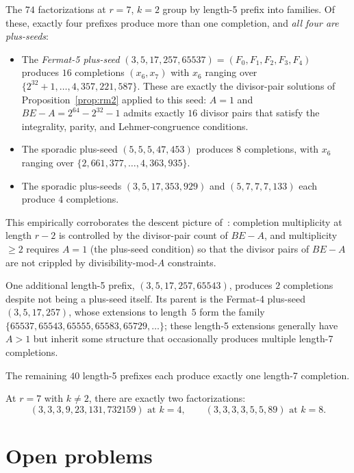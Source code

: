 \documentclass[11pt]{article}
\theoremstyle{definition}
\theoremstyle{remark}
\begin{document}
The $74$ factorizations at $r = 7$, $k = 2$ group by length-5 prefix
into families. Of these, exactly four prefixes produce more than one
completion, and \emph{all four are plus-seeds}:
\begin{itemize}
  \item The \emph{Fermat-5 plus-seed} $(3, 5, 17, 257, 65537) = (F_0,
    F_1, F_2, F_3, F_4)$ produces $16$ completions $(x_6, x_7)$ with
    $x_6$ ranging over $\{2^{32}+1, \ldots, 4{,}357{,}221{,}587\}$.
    These are exactly the divisor-pair solutions of
    Proposition~\ref{prop:rm2} applied to this seed: $A = 1$ and
    $BE - A = 2^{64} - 2^{32} - 1$ admits exactly $16$ divisor pairs
    that satisfy the integrality, parity, and Lehmer-congruence
    conditions.
  \item The sporadic plus-seed $(5, 5, 5, 47, 453)$ produces $8$
    completions, with $x_6$ ranging over
    $\{2{,}661{,}377, \ldots, 4{,}363{,}935\}$.
  \item The sporadic plus-seeds $(3, 5, 17, 353, 929)$ and
    $(5, 7, 7, 7, 133)$ each produce $4$ completions.
\end{itemize}
This empirically corroborates the descent picture
of~\cite{MFT}: completion multiplicity at length $r - 2$ is
controlled by the divisor-pair count of $BE - A$, and
multiplicity~$\ge 2$ requires $A = 1$ (the plus-seed condition) so
that the divisor pairs of $BE - A$ are not crippled by
divisibility-mod-$A$ constraints.

One additional length-5 prefix, $(3, 5, 17, 257, 65543)$, produces
$2$ completions despite not being a plus-seed itself. Its parent is
the Fermat-4 plus-seed $(3, 5, 17, 257)$, whose extensions to
length~$5$ form the family $\{65537, 65543, 65555, 65583, 65729,
\ldots\}$; these length-5 extensions generally have $A > 1$ but
inherit some structure that occasionally produces multiple
length-7 completions.

The remaining $40$ length-5 prefixes each produce exactly one
length-7 completion.

At $r = 7$ with $k \ne 2$, there are exactly two factorizations:
\[
  (3, 3, 3, 9, 23, 131, 732159) \text{ at } k = 4,
  \qquad
  (3, 3, 3, 3, 5, 5, 89) \text{ at } k = 8.
\]


\section{Open problems}\label{sec:open}
\end{document}
